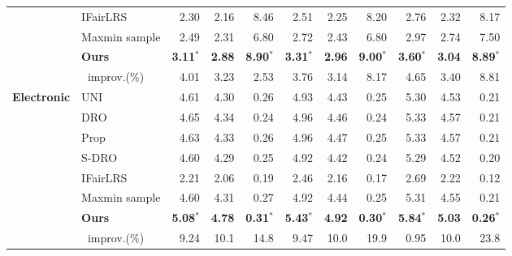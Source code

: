 \begin{table*}[t]
{\begin{tabular}{@{}clrrrrrrrrr@{}}
 & IFairLRS & 2.30 & 2.16 & 8.46 & 2.51 & 2.25 & 8.20 & 2.76 & 2.32 & 8.17 \\  
 & Maxmin sample & 2.49 & 2.31 & 6.80 & 2.72 & 2.43 & 6.80 & 2.97 & 2.74 & 7.50 \\
 \cmidrule(l){2-5} \cmidrule(l){6-8} \cmidrule(l){9-11}
 & \textbf{Ours} & \textbf{3.11}$^*$ & \textbf{2.88} & \textbf{8.90}$^*$ & \textbf{3.31}$^*$ & \textbf{2.96} & \textbf{9.00}$^*$  & \textbf{3.60}$^*$ & \textbf{3.04} & \textbf{8.89}$^*$  \\ 
 & $\;\;$improv.(\%) & 4.01 & 3.23 & 2.53 & 3.76 & 3.14 & 8.17 & 4.65 & 3.40 & 8.81 \\
 \hline
  \multirow{8}{*}{\textbf{Electronic}} & UNI & 4.61& 4.30& 0.26& 4.93& 4.43& 0.25& 5.30 & 4.53 & 0.21 \\ 
 & DRO & 4.65 & 4.34& 0.24& 4.96& 4.46& 0.24& 5.33& 4.57& 0.21 \\ 
 & Prop & 4.63& 4.33& 0.26& 4.96& 4.47& 0.25& 5.33& 4.57& 0.21 \\ 
 & S-DRO &  4.60 & 4.29& 0.25& 4.92& 4.42& 0.24& 5.29& 4.52& 0.20 \\ 
 & IFairLRS & 2.21& 2.06& 0.19& 2.46& 2.16& 0.17& 2.69& 2.22& 0.12 \\  
 & Maxmin sample & 4.60& 4.31& 0.27& 4.92& 4.44& 0.25& 5.31& 4.55& 0.21\\
 \cmidrule(l){2-5} \cmidrule(l){6-8} \cmidrule(l){9-11}
 & \textbf{Ours} & \textbf{5.08}$^*$ & \textbf{4.78} & \textbf{0.31}$^*$ & \textbf{5.43}$^*$ & \textbf{4.92} & \textbf{0.30}$^*$  & \textbf{5.84}$^*$ & \textbf{5.03} & \textbf{0.26}$^*$  \\ 
 & $\;\;$improv.(\%) & 9.24 & 10.1 & 14.8 & 9.47 & 10.0 & 19.9 & 0.95 & 10.0 & 23.8\\
 \bottomrule
 
\end{tabular}

}
\end{table*}



